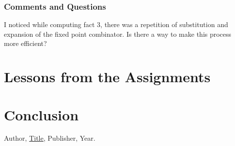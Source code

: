 \documentclass{article}
\theoremstyle{theorem}
\theoremstyle{definition}
\theoremstyle{remark}
\begin{document}
\subsubsection*{Comments and Questions}
I noticed while computing fact 3, there was a repetition of substitution and expansion of the fixed point combinator. Is there a way to make this process more efficient?

\section{Lessons from the Assignments}


\section{Conclusion}\label{conclusion}


\begin{thebibliography}{99}
 Author, \href{https://en.wikipedia.org/wiki/LaTeX}{Title}, Publisher, Year.
\end{thebibliography}
\end{document}

